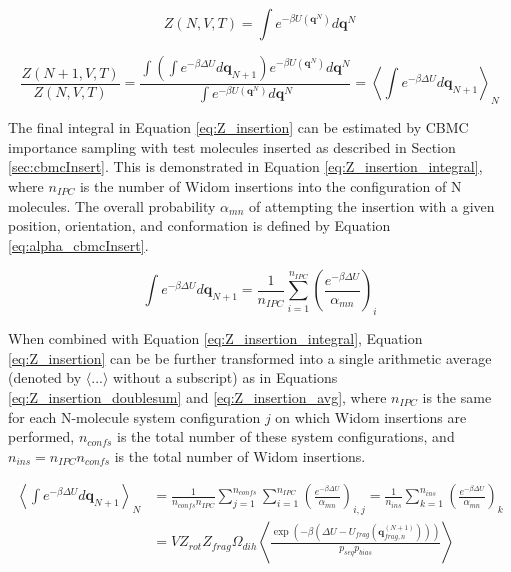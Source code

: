 \begin{equation}
    \label{eq:Z_NVT}
    Z(N,V,T) = \int e^{-\beta U(\mathbf{q}^N)} d\mathbf{q}^N
\end{equation}

\begin{equation}
    \label{eq:Z_insertion}
    \frac{Z(N+1,V,T)}{Z(N,V,T)} =
    \frac{\int \left(\int e^{-\beta \Delta U}d\mathbf{q}_{N+1}\right) e^{-\beta U(\mathbf{q}^N)} d\mathbf{q}^N}{\int e^{-\beta U(\mathbf{q}^N)} d\mathbf{q}^N} =
    \left\langle{\int e^{-\beta \Delta U} d\mathbf{q}_{N+1}}\right\rangle_N
\end{equation}

The final integral in Equation \ref{eq:Z_insertion} can be estimated by CBMC importance sampling with test molecules inserted as described in Section \ref{sec:cbmcInsert}. This is demonstrated in Equation \ref{eq:Z_insertion_integral}, where $n_{IPC}$ is the number of Widom insertions into the configuration of N molecules. The overall probability $\alpha_{mn}$ of attempting the insertion with a given position, orientation, and conformation is defined by Equation \ref{eq:alpha_cbmcInsert}.   

\begin{equation}
    \label{eq:Z_insertion_integral}
    \int e^{-\beta \Delta U} d\mathbf{q}_{N+1} =
    \frac{1}{n_{IPC}} \sum_{i=1}^{n_{IPC}} {\left( {\frac{ e^{-\beta \Delta U}}{\alpha_{mn}} }\right)}_i
\end{equation}

When combined with Equation \ref{eq:Z_insertion_integral}, Equation \ref{eq:Z_insertion} can be be further transformed into a single arithmetic average (denoted by $\langle ... \rangle$ without a subscript) as in Equations \ref{eq:Z_insertion_doublesum} and \ref{eq:Z_insertion_avg}, where $n_{IPC}$ is the same for each N-molecule system configuration $j$ on which Widom insertions are performed, $n_{confs}$ is the total number of these system configurations, and $n_{ins}=n_{IPC} n_{confs}$ is the total number of Widom insertions.

\begin{align}
    \label{eq:Z_insertion_doublesum}
    \left\langle{\int e^{-\beta \Delta U} d\mathbf{q}_{N+1}}\right\rangle_N &= 
    \frac{1}{n_{confs} n_{IPC}} \sum_{j=1}^{n_{confs}} 
    \sum_{i=1}^{n_{IPC}} {\left( {\frac{ e^{-\beta \Delta U}}{\alpha_{mn}} }\right)}_{i,j}
    = \frac{1}{n_{ins}} \sum_{k=1}^{n_{ins}} {\left( {\frac{ e^{-\beta \Delta U}}{\alpha_{mn}} }\right)}_k \\
    \label{eq:Z_insertion_avg}
    &= V Z_{rot} Z_{frag} \Omega_{dih} \left\langle 
    \frac{\exp{(-\beta({\Delta}U-U_{frag} (\mathbf{q}_{frag,n}^{(N+1)} )))}}{p_{seq} p_{bias}}
    \right\rangle
\end{align}

